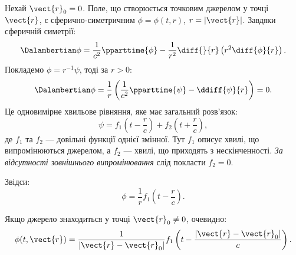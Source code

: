 Нехай $\vect{r}_0 = 0$. Поле, що створюється точковим джерелом у точці $\vect{r}$, є сферично-симетричним $\phi =
\phi(t, r)$, $r = |\vect{r}|$. Завдяки сферичній симетрії:
\begin{equation*}
	\Dalambertian \phi = \frac1{c^2}\pparttime{\phi} - \frac1{r^2} \diff{}{r}\left(r^2 \diff{\phi}{r} \right) .
\end{equation*}
Покладемо $\phi = r^{-1}\psi$, тоді за $r>0$:
\begin{equation*}
	\Dalambertian \phi = \frac1r \left( \frac1{c^2}\pparttime{\psi} - \ddiff{\psi}{r}\right) =0 .
\end{equation*}
Це одновимірне хвильове рівняння, яке має загальний розв'язок:
\begin{equation*}
	\psi = f_1\left( t - \frac{r}c \right) + f_2\left( t + \frac{r}c \right),
\end{equation*}
де $f_1$ та $f_2$ --- довільні функції однієї змінної. Тут $f_1$ описує хвилі, що випромінюються джерелом, а $f_2$ ---
хвилі, що приходять з нескінченності. \emph{За відсутності зовнішнього випромінювання} слід покласти $f_2=0$.

Звідси:
\begin{equation*}
	\phi = \frac1r f_1\left( t - \frac{r}c \right).
\end{equation*}

Якщо джерело знаходиться у точці $\vect{r}_0 \neq 0$, очевидно:
\begin{equation}\label{eq:rad_phi}
	\phi(t, \vect{r}) = \frac1{|\vect{r} - \vect{r}_0|} f_1\left( t - \frac{|\vect{r} - \vect{r}_0|}c \right).
\end{equation}


